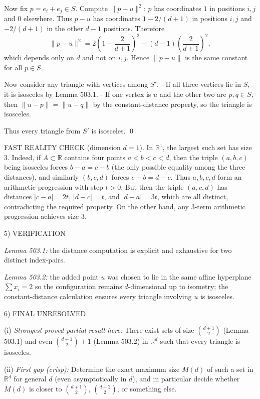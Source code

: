 Now fix $p=e_i+e_j\in S$.
Compute $\lVert p-u\rVert^2$:
$p$ has coordinates $1$ in positions $i,j$ and $0$ elsewhere.
Thus $p-u$ has coordinates $1-2/(d+1)$ in positions $i,j$ and $-2/(d+1)$ in the other $d-1$ positions.
Therefore
\[
\lVert p-u\rVert^2
=2\left(1-\frac{2}{d+1}\right)^2+(d-1)\left(\frac{2}{d+1}\right)^2,
\]
which depends only on $d$ and not on $i,j$.
Hence $\lVert p-u\rVert$ is the same constant for all $p\in S$.

Now consider any triangle with vertices among $S'$.
- If all three vertices lie in $S$, it is isosceles by Lemma 503.1.
- If one vertex is $u$ and the other two are $p,q\in S$, then $\lVert u-p\rVert=\lVert u-q\rVert$ by the constant-distance property, so the triangle is isosceles.

Thus every triangle from $S'$ is isosceles.
\qed

FAST REALITY CHECK (dimension $d=1$).
In $\mathbb R^1$, the largest such set has size $3$.
Indeed, if $A\subset\mathbb R$ contains four points $a<b<c<d$, then the triple $(a,b,c)$ being isosceles forces $b-a=c-b$ (the only possible equality among the three distances), and similarly $(b,c,d)$ forces $c-b=d-c$. Thus $a,b,c,d$ form an arithmetic progression with step $t>0$.
But then the triple $(a,c,d)$ has distances $\lvert c-a\rvert=2t$, $\lvert d-c\rvert=t$, and $\lvert d-a\rvert=3t$, which are all distinct, contradicting the required property.
On the other hand, any 3-term arithmetic progression achieves size 3.

5) VERIFICATION

\emph{Lemma 503.1:} the distance computation is explicit and exhaustive for two distinct index-pairs.

\emph{Lemma 503.2:} the added point $u$ was chosen to lie in the same affine hyperplane $\sum x_i=2$ so the configuration remains $d$-dimensional up to isometry; the constant-distance calculation ensures every triangle involving $u$ is isosceles.

6) FINAL
UNRESOLVED

(i) \emph{Strongest proved partial result here:} There exist sets of size $\binom{d+1}{2}$ (Lemma 503.1) and even $\binom{d+1}{2}+1$ (Lemma 503.2) in $\mathbb R^d$ such that every triangle is isosceles.

(ii) \emph{First gap (crisp):} Determine the exact maximum size $M(d)$ of such a set in $\mathbb R^d$ for general $d$ (even asymptotically in $d$), and in particular decide whether $M(d)$ is closer to $\binom{d+1}{2}$, $\binom{d+2}{2}$, or something else.

